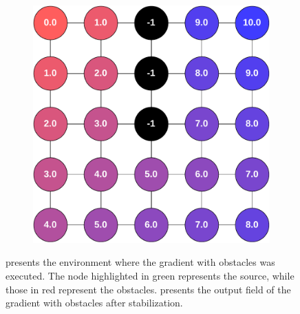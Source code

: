 \begin{figure}
\begin{subfigure}[b]{.49\textwidth}
        \caption{}
        \label{fig:gradient-envronment}
    \end{subfigure}
    \hfill
    \begin{subfigure}[b]{.49\textwidth}
        \centering
        \includegraphics[width=\textwidth]{figures/gradient-environment-execution.pdf}
        \caption{}
        \label{fig:gradient-envronment-execution}
    \end{subfigure}
    \caption{ presents the environment where the gradient with obstacles was executed. The node highlighted in green represents the source, while those in red represent the obstacles.  presents the output field of the gradient with obstacles after stabilization.}
    \label{fig:gradient-environment-and-execution}
\end{figure}





